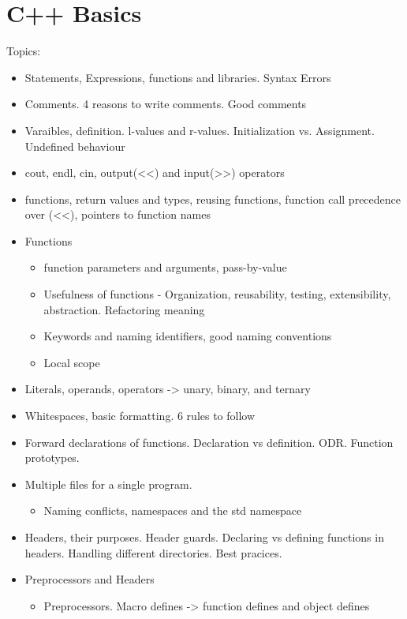 \chapter{C++ Basics}

Topics:
\begin{itemize}
    \item Statements, Expressions, functions and libraries. Syntax Errors
    \item Comments. 4 reasons to write comments. Good comments
    \item Varaibles, definition. l-values and r-values. Initialization
    vs. Assignment. Undefined behaviour
    \item cout, endl, cin, output(<<) and input(>>) operators
    \item functions, return values and types, reusing functions,
    function call precedence over (<<), pointers to function names
    \item Functions
    \begin{itemize}
        \item function parameters and arguments, pass-by-value
        \item Usefulness of functions - Organization, reusability, testing, 
        extensibility, abstraction. Refactoring meaning
        \item Keywords and naming identifiers, good naming conventions
        \item Local scope
    \end{itemize}
    \item Literals, operands, operators -> unary, binary, and ternary
    \item Whitespaces, basic formatting. 6 rules to follow
    \item Forward declarations of functions. Declaration vs definition. ODR. Function prototypes.
    \item Multiple files for a single program.
    \begin{itemize}
        \item Naming conflicts, namespaces and the std namespace
    \end{itemize}
    \item Headers, their purposes. Header guards. Declaring vs defining
    functions in headers. Handling different directories. Best pracices.
    \item Preprocessors and Headers
    \begin{itemize}
        \item Preprocessors. Macro defines -> function defines and object defines

\end{itemize}
\end{itemize}

